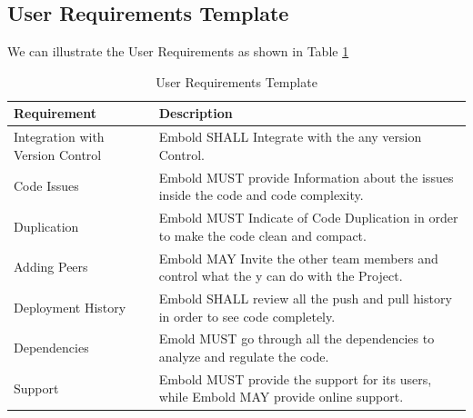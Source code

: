 \subsection{User Requirements Template}
We can illustrate the User Requirements as shown in Table \ref{tab:Requirement}
\begin{table}[h]

\begin{center}
\begin{tabular}{|p{6cm}|p{9cm}|}
\hline
\textbf{Requirement} & \textbf{Description} \\

\hline
Integration with Version Control & Embold SHALL Integrate with the any version Control. \\
\hline
Code Issues & Embold MUST  provide Information about the issues inside the code and code complexity. \\
\hline
Duplication & Embold MUST Indicate of Code Duplication in order to make the code clean and compact. \\
\hline
Adding Peers &Embold MAY Invite the other team members and control what the y can do with the Project. \\
\hline
Deployment History & Embold SHALL  review all the push and pull history in order to see code completely. \\
\hline
Dependencies & Emold MUST go through all the dependencies to analyze and regulate the code. \\
\hline
Support & Embold MUST provide the support for its users, while Embold MAY provide online support.\\
\hline
\end{tabular}
\end{center}
\caption{User Requirements Template}
\label{tab:Requirement}

\end{table}

